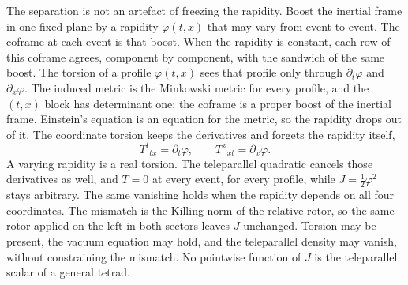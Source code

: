 \documentclass[a4paper]{article}
\begin{document}
The separation is not an artefact of freezing the rapidity. Boost the inertial frame in one fixed plane by a rapidity $\varphi(t,x)$ that may vary from event to event. The coframe at each event is that boost. When the rapidity is constant, each row of this coframe agrees, component by component, with the sandwich of the same boost. The torsion of a profile $\varphi(t,x)$ sees that profile only through $\partial_t\varphi$ and $\partial_x\varphi$. The induced metric is the Minkowski metric for every profile, and the $(t,x)$ block has determinant one: the coframe is a proper boost of the inertial frame. Einstein's equation is an equation for the metric, so the rapidity drops out of it. The coordinate torsion keeps the derivatives and forgets the rapidity itself,
\[
T^t{}_{tx}=\partial_t\varphi,\qquad T^x{}_{xt}=\partial_x\varphi.
\]
A varying rapidity is a real torsion. The teleparallel quadratic cancels those derivatives as well, and $T=0$ at every event, for every profile, while $J=\tfrac12\varphi^2$ stays arbitrary. The same vanishing holds when the rapidity depends on all four coordinates. The mismatch is the Killing norm of the relative rotor, so the same rotor applied on the left in both sectors leaves $J$ unchanged. Torsion may be present, the vacuum equation may hold, and the teleparallel density may vanish, without constraining the mismatch. No pointwise function of $J$ is the teleparallel scalar of a general tetrad.
\end{document}
